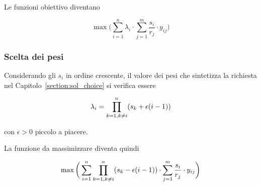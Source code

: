Le funzioni obiettivo diventano

\begin{equation}
    \max \bigg( \sum_{i=1}^{n} \lambda_{i} \cdot \sum_{j = 1}^{m}\frac{s_i}{r_j} \cdot y_{ij}\bigg)
    \label{eq:}
\end{equation}

\subsubsection{Scelta dei pesi}

Considerando gli $s_i$ in ordine crescente, il valore dei pesi che sintetizza la richiesta 
nel Capitolo~\ref{section:sol_choice} si verifica essere

\begin{equation}
    \lambda_i = \prod_{k=1,\\ k\neq i}^{n} (s_k + \epsilon (i -1))
    \label{eq:}
\end{equation}

\noindent
con $\epsilon > 0$ piccolo a piacere.

La funzione da massimizzare diventa quindi

\begin{equation}
    \max \bigg( \sum_{i=1}^{n} \prod_{k=1,\\ k\neq i}^{n} (s_k - \epsilon (i- 1)) \cdot \sum_{j = 1}^{m}\frac{s_i}{r_j} \cdot y_{ij}\bigg)
    \label{eq:single_obj}
\end{equation}

